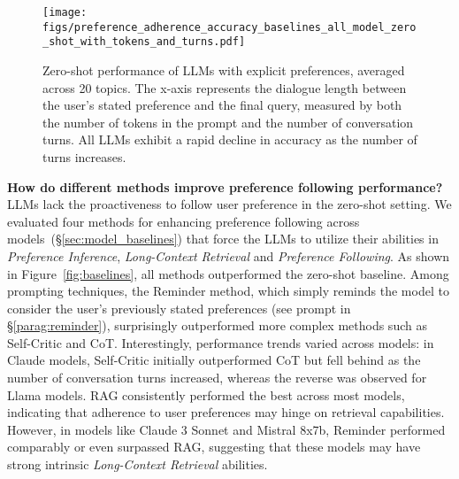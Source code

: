 \begin{figure}[ht]
    \centering
    \begin{minipage}{0.60\textwidth}
        \texttt{[image: figs/preference\_adherence\_accuracy\_baselines\_all\_model\_zero\_shot\_with\_tokens\_and\_turns.pdf]}
    \end{minipage}%
    \hfill
    \begin{minipage}{0.38\textwidth}
        \caption{Zero-shot performance of LLMs with explicit preferences, averaged across 20 topics. The x-axis represents the dialogue length between the user's stated preference and the final query, measured by both the number of tokens in the prompt and the number of conversation turns. All LLMs exhibit a rapid decline in accuracy as the number of turns increases.}
        \label{fig:zeroshot}
    \end{minipage}
\end{figure}



\textbf{How do different methods improve preference following performance?} LLMs lack the proactiveness to follow user preference in the zero-shot setting. We evaluated four methods for enhancing preference following across models~(\S\ref{sec:model_baselines}) that force the LLMs to utilize their abilities in \textit{Preference Inference}, \textit{Long-Context Retrieval} and \textit{Preference Following}. As shown in Figure~\ref{fig:baselines}, all methods outperformed the zero-shot baseline. Among prompting techniques, the Reminder method, which simply reminds the model to consider the user’s previously stated preferences (see prompt in \S\ref{parag:reminder}), surprisingly outperformed more complex methods such as Self-Critic and CoT. Interestingly, performance trends varied across models: in Claude models, Self-Critic initially outperformed CoT but fell behind as the number of conversation turns increased, whereas the reverse was observed for Llama models. RAG consistently performed the best across most models, indicating that adherence to user preferences may hinge on retrieval capabilities. However, in models like Claude 3 Sonnet and Mistral 8x7b, Reminder performed comparably or even surpassed RAG, suggesting that these models may have strong intrinsic \textit{Long-Context Retrieval} abilities.





